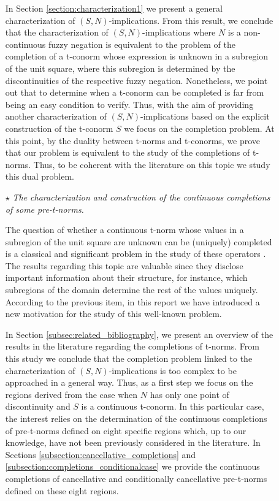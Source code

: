 \begin{description}
\begin{itemize}
		In Section \ref{section:characterization1}  we present a general characterization of $(S,N)$-implications. From this result, we conclude that the characterization of $(S,N)$-implications where $N$ is a non-continuous fuzzy negation is equivalent to the problem of the completion of a t-conorm whose expression is unknown in a subregion of the unit square, where this subregion is determined by the discontinuities of the respective fuzzy negation. Nonetheless, we point out that to determine when a t-conorm can be completed is far from being an easy condition to verify. Thus, with the aim of providing another characterization of $(S,N)$-implications based on the explicit construction of the t-conorm $S$ we focus on the completion problem. At this point, by the duality between t-norms and t-conorms, we prove that our problem is equivalent to the study of the completions of t-norms. Thus, to be coherent with the literature on this topic \cite{Alsina2006,Klement2000} we study this dual problem.

		\item[$\star$] \textit{The characterization and construction of the continuous completions of some pre-t-norms.}
		
		The question of whether a continuous t-norm whose values in a subregion of the unit square are unknown can be (uniquely) completed is a classical and significant problem in the study of these operators \cite{Alsina2006,Klement2000}. The results regarding this topic are valuable since they disclose important information about their structure, for instance, which subregions of the domain determine the rest of the values uniquely. According to the previous item, in this report we have introduced a new motivation for the study of this well-known problem.
		
		In Section \ref{subsec:related_bibliography}, we present an overview of the results in the literature regarding the completions of t-norms. From this study we conclude that the completion problem linked to the characterization of $(S,N)$-implications is too complex to be approached in a general way. Thus, as a first step we focus on the regions derived from the case when $N$ has only one point of discontinuity and $S$ is a continuous t-conorm. In this particular case, the interest relies on the determination of the continuous completions of pre-t-norms defined on eight specific regions which, up to our knowledge, have not been previously considered in the literature. In Sections \ref{subsection:cancellative_completions} and \ref{subsection:completions_conditionalcase} we provide the continuous completions of cancellative and conditionally cancellative pre-t-norms defined on these eight regions.
		

\end{itemize}
\end{description}
